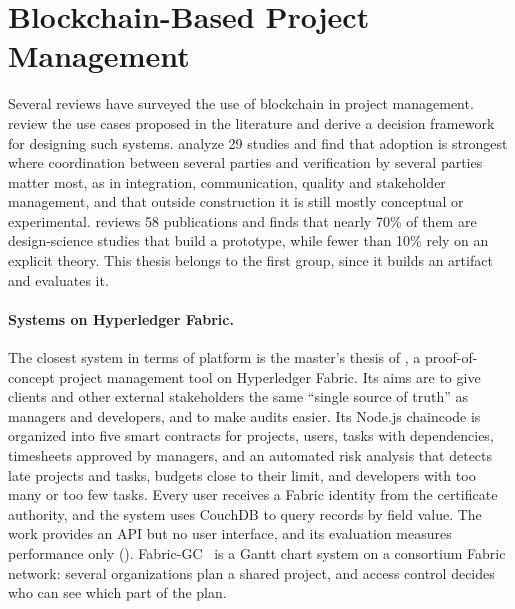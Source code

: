 \section{Blockchain-Based Project Management}
\label{sec:related-pm}

Several reviews have surveyed the use of blockchain in project management. \textcite{sonmez2021review} review the use cases proposed in the literature and derive a decision framework for designing such systems. \textcite{noteboom2026coordination} analyze 29 studies and find that adoption is strongest where coordination between several parties and verification by several parties matter most, as in integration, communication, quality and stakeholder management, and that outside construction it is still mostly conceptual or experimental. \textcite{seru2025design} reviews 58 publications and finds that nearly 70\% of them are design-science studies that build a prototype, while fewer than 10\% rely on an explicit theory. This thesis belongs to the first group, since it builds an artifact and evaluates it.

\paragraph{Systems on Hyperledger Fabric.} The closest system in terms of platform is the master's thesis of \textcite{batista2021}, a proof-of-concept project management tool on Hyperledger Fabric. Its aims are to give clients and other external stakeholders the same ``single source of truth'' as managers and developers, and to make audits easier. Its Node.js chaincode is organized into five smart contracts for projects, users, tasks with dependencies, timesheets approved by managers, and an automated risk analysis that detects late projects and tasks, budgets close to their limit, and developers with too many or too few tasks. Every user receives a Fabric identity from the certificate authority, and the system uses CouchDB to query records by field value. The work provides an API but no user interface, and its evaluation measures performance only (). Fabric-GC~\cite{li2022fabricgc} is a Gantt chart system on a consortium Fabric network: several organizations plan a shared project, and access control decides who can see which part of the plan.

